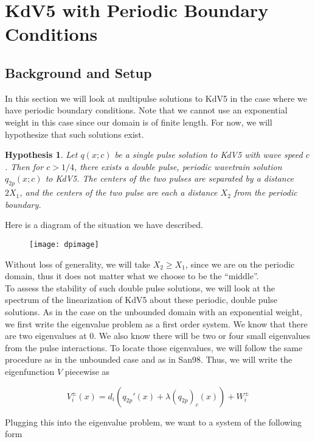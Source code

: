 \documentclass[12pt]{article}
\newtheorem{hypothesis}{Hypothesis}
\begin{document}
\section{KdV5 with Periodic Boundary Conditions}

\subsection{Background and Setup}

In this section we will look at multipulse solutions to KdV5 in the case where we have periodic boundary conditions. Note that we cannot use an exponential weight in this case since our domain is of finite length. For now, we will hypothesize that such solutions exist.

\begin{hypothesis}\label{q2pexists}
Let $q(x; c)$ be a single pulse solution to KdV5 with wave speed $c$. Then for $c > 1/4$, there exists a double pulse, periodic wavetrain solution $q_{2p}(x; c)$ to KdV5. The centers of the two pulses are separated by a distance $2 X_1$, and the centers of the two pulse are each a distance $X_2$ from the periodic boundary.
\end{hypothesis}

Here is a diagram of the situation we have described.

\begin{figure}[H]
\texttt{[image: dpimage]}
\end{figure}

Without loss of generality, we will take $X_2 \geq X_1$, since we are on the periodic domain, thus it does not matter what we choose to be the ``middle''.\\

To assess the stability of such double pulse solutions, we will look at the spectrum of the linearization of KdV5 about these periodic, double pulse solutions. As in the case on the unbounded domain with an exponential weight, we first write the eigenvalue problem as a first order system. We know that there are two eigenvalues at 0. We also know there will be two or four small eigenvalues from the pulse interactions. To locate those eigenvalues, we will follow the same procedure as in the unbounded case and as in San98. Thus, we will write the eigenfunction $V$ piecewise as

\[
V_i^\pm(x) = d_i (q_{2p}'(x) + \lambda (q_{2p})_c(x)) + W_i^\pm 
\]

Plugging this into the eigenvalue problem, we want to a system of the following form
\end{document}

